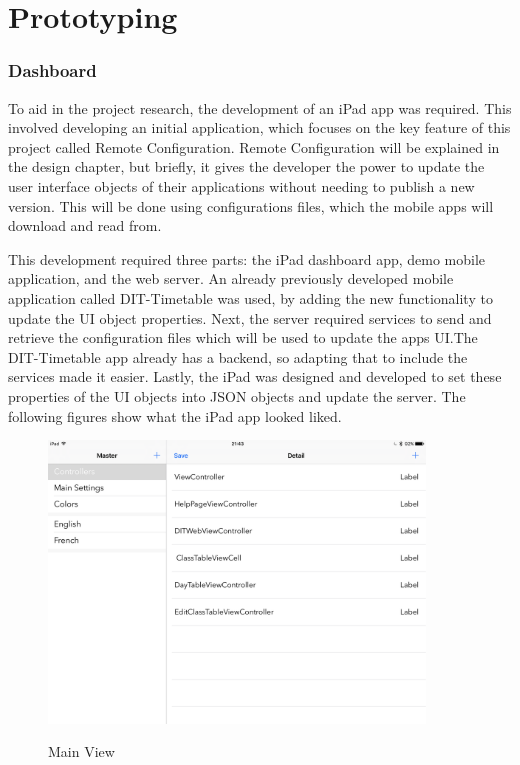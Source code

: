 
\section{Prototyping}

\subsubsection{Dashboard}

To aid in the project research, the development of an iPad app was required. This involved developing an initial application, which focuses on the key feature of this project called Remote Configuration. Remote Configuration will be explained in the design chapter, but briefly, it gives the developer the power to update the user interface objects of their applications without needing to publish a new version. This will be done using configurations files, which the mobile apps will download and read from.

This development required three parts: the iPad dashboard app, demo mobile application, and the web server. An already previously developed mobile application called DIT-Timetable was used, by adding the new functionality to update the UI object properties. Next, the server required services to send and retrieve the configuration files which will be used to update the apps UI.The DIT-Timetable app already has a backend, so adapting that to include the services made it easier. Lastly, the iPad was designed and developed to set these properties of the UI objects into JSON objects and update the server. The following figures show what the iPad app looked liked.

\begin{figure}[!h]
    \caption{Main View}
    \centering
    \includegraphics[width=100mm]{images/ipad-images/mainview}
    \label{fig:mainview}
\end{figure}

